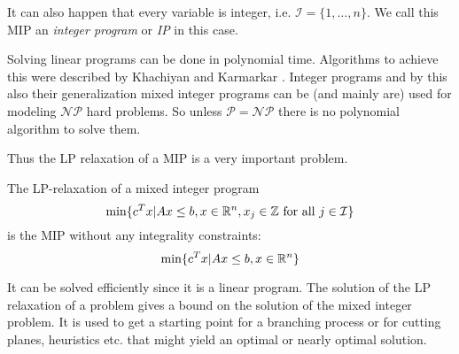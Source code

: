 It can also happen that every variable is integer, i.e. $\mathcal{I}=\{1,\dots, n\}$. We call this MIP an 
\textit{integer program} or \textit{IP} in this case.

Solving linear programs can be done in polynomial time. Algorithms to achieve this were described by 
Khachiyan\cite{KHACHIYAN198053} and Karmarkar \cite{Karmarkar:1984:NPA:800057.808695}. Integer programs and by this 
also their generalization mixed integer programs can be (and mainly are) used for modeling $\mathcal{NP}$ hard 
problems. So unless $\mathcal{P}=\mathcal{NP}$ there is no polynomial algorithm to solve them.

Thus the LP relaxation of a MIP is a very important problem.
\begin{definition}
 The LP-relaxation of a mixed integer program 
 $$\min\{c^T x|Ax\le b, x\in\mathbb{R}^n, x_j\in\mathbb{Z}\textrm{ for all }j\in\mathcal{I} \}$$
 is the MIP without any integrality constraints:
 $$\min\{c^T x|Ax\le b, x\in\mathbb{R}^n \}$$
\end{definition}

It can be solved efficiently since it is a linear program. The solution of the LP relaxation of a problem gives a
bound on the solution of the mixed integer problem. It is used to get a starting 
point for a branching process or for cutting planes, heuristics etc. that might yield an optimal or nearly optimal 
solution. 
